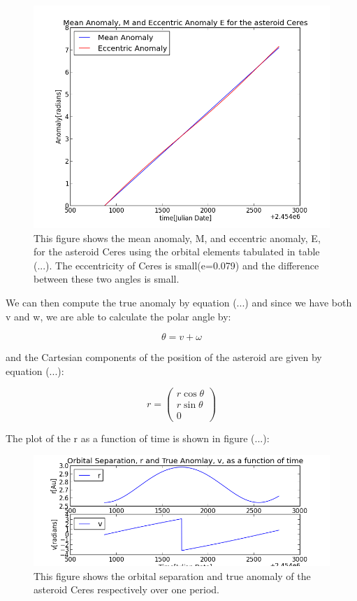 \documentclass[letterpaper,12pt]{article}
\begin{document}
\FloatBarrier
\begin{figure}[h!]
\centering
\includegraphics[scale=0.5]{figure3.png}
\caption{This figure shows the mean anomaly, M, and eccentric anomaly, E, for the asteroid Ceres using the orbital elements tabulated in table (...). The eccentricity of Ceres is small(e=0.079) and the difference between these two angles is small.}
\end{figure}
\FloatBarrier


We can then compute the true anomaly by equation (...) and since we have both v and w, we are able to calculate the polar angle by:

\begin{equation}
\theta = v + \omega
\end{equation}

and the Cartesian components of the position of the asteroid are given by equation (...):

\begin{equation}
r=
\begin{pmatrix}
  r\cos \theta \\
  r\sin \theta \\
  0
 \end{pmatrix} 
\end{equation}

The plot of the r as a function of time is shown in figure (...):
\FloatBarrier
\begin{figure}[h!]
\centering
\includegraphics[scale=0.7]{figure4.png}
\caption{This figure shows the orbital separation and true anomaly of the asteroid Ceres respectively over one period.}
\end{figure}
\FloatBarrier
\end{document}
